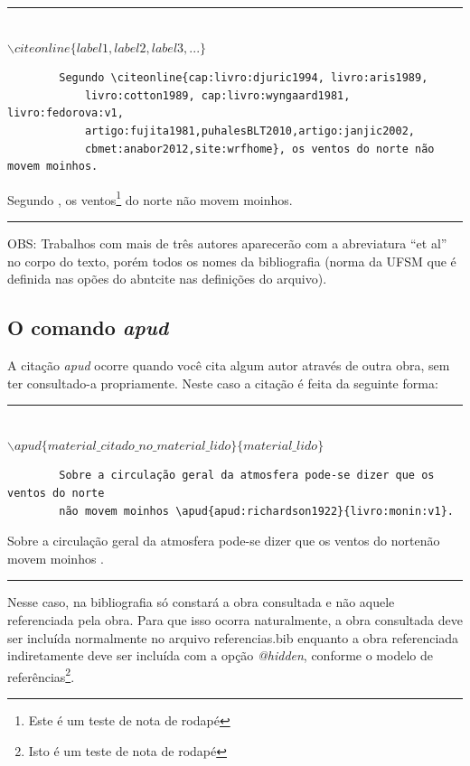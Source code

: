 	\begin{center}\rule{0.5\textwidth}{1pt}\\$\backslash citeonline\{label1,label2,label3,...\}$\end{center}
	
	\begin{verbatim}
		Segundo \citeonline{cap:livro:djuric1994, livro:aris1989, 
			livro:cotton1989, cap:livro:wyngaard1981, livro:fedorova:v1, 
			artigo:fujita1981,puhalesBLT2010,artigo:janjic2002,
			cbmet:anabor2012,site:wrfhome}, os ventos do norte não movem moinhos.
	\end{verbatim}
	
	\par Segundo , os ventos\footnote{Este é um teste de nota de rodapé} do norte não movem moinhos.
	\begin{center}\rule{0.5\textwidth}{1pt}\end{center}   
	\par OBS: Trabalhos com mais de três autores aparecerão com a abreviatura ``et al'' no corpo do texto, porém todos os nomes da bibliografia (norma da UFSM que é definida nas opões do abntcite nas definições do arquivo). 
	
	\subsection{O comando \textit{apud}}
	
	\par A citação \textit{apud} ocorre quando você cita algum autor através de outra obra, sem ter consultado-a propriamente. Neste caso a citação é feita da seguinte forma:
	\begin{center}
		\rule{0.5\textwidth}{1pt}\\
		$\backslash apud\{material\_citado\_no\_material\_lido\}\{material\_lido\}$ \\
	\end{center}
	\begin{verbatim}
		Sobre a circulação geral da atmosfera pode-se dizer que os ventos do norte
		não movem moinhos \apud{apud:richardson1922}{livro:monin:v1}.
	\end{verbatim}
	
	Sobre a circulação geral da atmosfera pode-se dizer que os ventos do nortenão movem moinhos .
	\begin{center}\rule{0.5\textwidth}{1pt}\end{center}  
	\par Nesse caso, na bibliografia só constará a obra consultada e não aquele referenciada pela obra. Para que isso ocorra naturalmente, a obra consultada deve ser incluída normalmente no arquivo referencias.bib enquanto a obra referenciada indiretamente deve ser incluída com a opção \textit{@hidden}, conforme o modelo de referências\footnote{Isto é um teste de nota de rodapé}.
	
